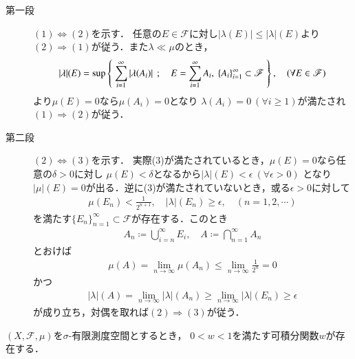 	\begin{prf}\mbox{}
		\begin{description}
			\item[第一段]
				$(1) \Leftrightarrow (2)$を示す．
				任意の$E \in \mathscr{F}$に対し$|\lambda(E)| \leq |\lambda|(E)$より
				$(2) \Rightarrow (1)$が従う．また$\lambda \ll \mu$のとき，
				\begin{align}
					|\lambda|(E) =
					\operatorname*{sup}_{} \left\{\ \sum_{i=1}^{\infty} |\lambda(A_i)|\ \, ; \quad E = \sum_{i=1}^\infty A_i,\ \{A_i\}_{i=1}^\infty \subset \mathscr{F}\ \right\},
					\quad (\forall E \in \mathscr{F})
				\end{align}
				より$\mu(E) = 0$なら$\mu(A_i) = 0$となり
				$\lambda(A_i) = 0\ (\forall i \geq 1)$が満たされ
				$(1) \Rightarrow (2)$が従う．
				
			\item[第二段]
				$(2) \Leftrightarrow (3)$を示す．
				実際(3)が満たされているとき，$\mu(E) = 0$なら任意の$\delta > 0$に対し
				$\mu(E) < \delta$となるから$|\lambda|(E) < \epsilon\ (\forall \epsilon > 0)$
				となり$|\mu|(E) = 0$が出る．逆に(3)が満たされていないとき，或る$\epsilon > 0$に対して
				\begin{align}
					\mu(E_n) < \frac{1}{2^{n+1}}, \quad |\lambda|(E_n) \geq \epsilon,
					\quad (n=1,2,\cdots)
				\end{align}
				を満たす$\{E_n\}_{n=1}^\infty \subset \mathscr{F}$が存在する．このとき
				\begin{align}
					A_n \coloneqq \bigcup_{i=n}^\infty E_i,
					\quad A \coloneqq \bigcap_{n=1}^\infty A_n
				\end{align}
				とおけば
				\begin{align}
					\mu(A) = \lim_{n \to \infty} \mu(A_n) 
					\leq \lim_{n \to \infty} \frac{1}{2^n} = 0
				\end{align}
				かつ
				\begin{align}
					|\lambda|(A) = \lim_{n \to \infty} |\lambda|(A_n) 
					\geq \lim_{n \to \infty} |\lambda|(E_n) \geq \epsilon 
				\end{align}
				が成り立ち，対偶を取れば$(2) \Rightarrow (3)$が従う．
				\QED
		\end{description}
	\end{prf}
	
	\begin{screen}
		\begin{lem}\label{lem:Lebesgue_Radon_Nikodym}
			$(X,\mathscr{F},\mu)$を$\sigma$-有限測度空間とするとき，
			$0 < w < 1$を満たす可積分関数$w$が存在する．
		\end{lem}
	\end{screen}
	

